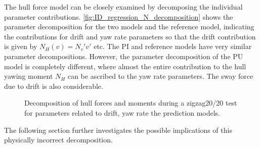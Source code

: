 The hull force model can be closely examined by decomposing the individual parameter contributions. \autoref{fig:ID_regression_N_decomposition} shows the parameter decomposition for the two models and the reference model, indicating the contributions for drift and yaw rate parameters so that the drift contribution is given by $N_H(v)={N_v}'v'$ etc. The PI  and reference models have very similar parameter decompositions.
However, the parameter decomposition of the PU model is completely different, where almost the entire contribution to the hull yawing moment $N_H$ can be ascribed to the yaw rate parameters. The sway force due to drift is also considerable.  
\begin{figure}[h]
    \begin{center}
        
        \caption{Decomposition of hull forces and moments during a zigzag20/20 test for parameters related to drift, yaw rate the prediction models.}
        \label{fig:ID_regression_N_decomposition}
    \end{center}
\end{figure}
The following section further investigates the possible implications of this physically incorrect decomposition.